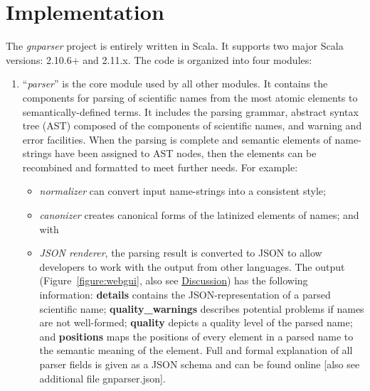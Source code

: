 \documentclass{bmcart}
\begin{document}
\section*{Implementation}

The \textit{gnparser} project is entirely written in Scala. It supports two
major Scala versions: 2.10.6+ and 2.11.x. The code is organized into four
modules:

\begin{enumerate}

  \item ``\textit{parser}'' is the core module used by all other modules. It
    contains the components for parsing of scientific names from the most
    atomic elements to semantically-defined terms. It includes the parsing
    grammar, abstract syntax tree (AST) composed of the components of
    scientific names, and warning and error facilities. When the parsing is
    complete and semantic elements of name-strings have been assigned to AST
    nodes, then the elements can be recombined and formatted to meet further
    needs. For example:

\begin{itemize}

  \item \textit{normalizer} can convert input name-strings into a consistent
    style;

  \item \textit{canonizer} creates canonical forms of the latinized elements of
    names; and with

  \item \textit{JSON renderer}, the parsing result is converted to JSON
    \cite{bray2014javascript} to allow developers to work with the output from
    other languages. The output (Figure~\ref{figure:webgui}, also see
    \hyperref[sec:discussion]{Discussion}) has the following information:
    \textbf{details} contains the JSON-representation of a parsed scientific
    name; \textbf{quality\_warnings} describes potential problems if names are
    not well-formed; \textbf{quality} depicts a quality level of the parsed
    name; and \textbf{positions} maps the positions of every element in a
    parsed name to the semantic meaning of the element. Full and formal
    explanation of all parser fields is given as a JSON schema and can be found
    online \cite{gnparser-json} [also see additional file gnparser.json].

\end{itemize}


\end{enumerate}
\end{document}
